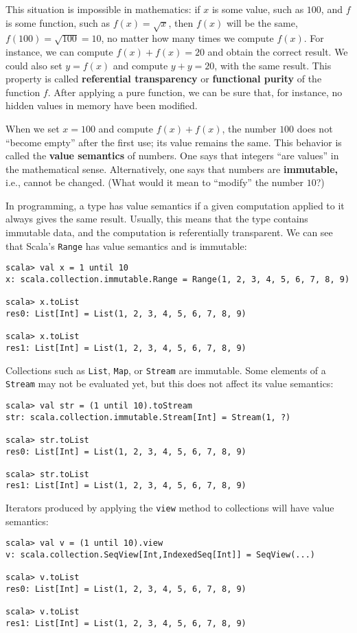 This situation is impossible in mathematics: if $x$ is some value,
such as $100$, and $f$ is some function, such as $f(x)=\sqrt{x}$,
then $f(x)$ will be the same, $f(100)=\sqrt{100}=10$, no matter
how many times we compute $f(x)$. For instance, we can compute $f(x)+f(x)=20$
and obtain the correct result. We could also set $y=f(x)$ and compute
$y+y=20$, with the same result. This property is called \textbf{referential
transparency} or \textbf{functional purity}
of the function $f$. After applying a pure function, we can be sure
that, for instance, no hidden values in memory have been modified.

When we set $x=100$ and compute $f(x)+f(x)$, the number $100$ does
not \textsf{``}become empty\textsf{''} after the first use; its value remains the
same. This behavior is called the \textbf{value
semantics} of numbers. One says that integers \textsf{``}are values\textsf{''} in
the mathematical sense. Alternatively, one says that numbers are \textbf{immutable,}
i.e., cannot be changed. (What would it mean to \textsf{``}modify\textsf{''} the number
$10$?)

In programming, a type has value semantics if a given computation
applied to it always gives the same result. Usually, this means that
the type contains immutable data, and the computation is referentially
transparent. We can see that Scala\textsf{'}s \lstinline!Range! has value
semantics and is immutable:
\begin{lstlisting}
scala> val x = 1 until 10
x: scala.collection.immutable.Range = Range(1, 2, 3, 4, 5, 6, 7, 8, 9)

scala> x.toList
res0: List[Int] = List(1, 2, 3, 4, 5, 6, 7, 8, 9)

scala> x.toList
res1: List[Int] = List(1, 2, 3, 4, 5, 6, 7, 8, 9) 
\end{lstlisting}
Collections such as \lstinline!List!, \lstinline!Map!, or \lstinline!Stream!
are immutable. Some elements of a \lstinline!Stream! may not be evaluated
yet, but this does not affect its value semantics:
\begin{lstlisting}
scala> val str = (1 until 10).toStream
str: scala.collection.immutable.Stream[Int] = Stream(1, ?)

scala> str.toList
res0: List[Int] = List(1, 2, 3, 4, 5, 6, 7, 8, 9)

scala> str.toList
res1: List[Int] = List(1, 2, 3, 4, 5, 6, 7, 8, 9) 
\end{lstlisting}
Iterators produced by applying the \lstinline!view! method to collections
will have value semantics:
\begin{lstlisting}
scala> val v = (1 until 10).view
v: scala.collection.SeqView[Int,IndexedSeq[Int]] = SeqView(...)

scala> v.toList
res0: List[Int] = List(1, 2, 3, 4, 5, 6, 7, 8, 9)

scala> v.toList
res1: List[Int] = List(1, 2, 3, 4, 5, 6, 7, 8, 9)
\end{lstlisting}

